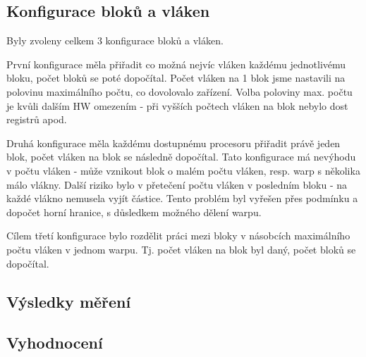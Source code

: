 \documentclass[12pt]{article}
\begin{document}
\subsection{Konfigurace bloků a vláken}
Byly zvoleny celkem 3 konfigurace bloků a vláken.

První konfigurace měla přiřadit co možná nejvíc vláken každému jednotlivému bloku, počet bloků se poté dopočítal.
Počet vláken na 1 blok jsme nastavili na polovinu maximálního počtu, co dovolovalo zařízení.
Volba poloviny max. počtu je kvůli dalším HW omezením - při vyšších počtech vláken na blok nebylo dost registrů apod.

Druhá konfigurace měla každému dostupnému procesoru přiřadit právě jeden blok, počet vláken na blok se následně dopočítal.
Tato konfigurace má nevýhodu v počtu vláken - může vznikout blok o malém počtu vláken, resp. warp s několika málo vlákny.
Další riziko bylo v přetečení počtu vláken v posledním bloku - na každé vlákno nemusela vyjít částice.
Tento problém byl vyřešen přes podmínku a dopočet horní hranice, s důsledkem možného dělení warpu.

Cílem třetí konfigurace bylo rozdělit práci mezi bloky v násobcích maximálního počtu vláken v jednom warpu.
Tj. počet vláken na blok byl daný, počet bloků se dopočítal.

\subsection{Výsledky měření}


\subsection{Vyhodnocení}
\end{document}
